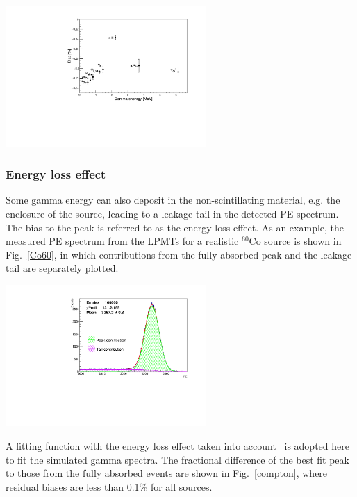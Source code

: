 \documentclass[a4paper,10pt,twoside]{cpc-hepnp}
\begin{document}
\begin{CJK*}{GB}{gbsn}
\begin{multicols}{2}
\begin{center}
	\centering
	\includegraphics[width=3in]{Bias_Shadowing.pdf}
	\label{shadowing}
\end{center}

\subsubsection{Energy loss effect}
\label{sec:eloss}
Some gamma energy can also deposit in the non-scintillating material,
e.g. the enclosure of the source, leading to a leakage tail in the
detected PE spectrum. The bias to the peak is referred to as the
energy loss effect. As an example, the measured PE spectrum from the
LPMTs for a realistic $^{60}$Co source is shown in Fig.~\ref{Co60}, in
which contributions from the fully absorbed peak and the leakage tail
are separately plotted. 
\begin{center}
	\includegraphics[width=3in]{Co60result_emc.pdf}
	\label{Co60}
\end{center}
A fitting function with the energy loss effect taken into
account~\cite{fitmethod} is adopted here to fit the simulated gamma
spectra. The fractional difference of the best fit peak to those from
the fully absorbed events are shown in Fig.~\ref{compton}, where
residual biases are less than 0.1\% for all sources.


\end{multicols}
\end{CJK*}
\end{document}
